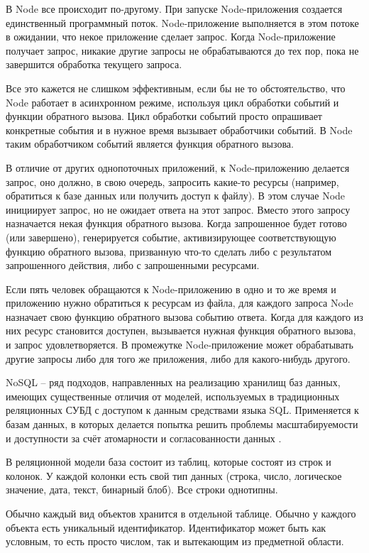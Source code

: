 В Node все происходит по-другому. При запуске Node-приложения создается единственный программный поток. Node-приложение выполняется в этом потоке в ожидании, что некое приложение сделает запрос. Когда Node-приложение получает запрос, никакие другие запросы не обрабатываются до тех пор, пока не завершится обработка текущего запроса.

Все это кажется не слишком эффективным, если бы не то обстоятельство, что Node работает в асинхронном режиме, используя цикл обработки событий и функции обратного вызова. Цикл обработки событий просто опрашивает конкретные события и в нужное время вызывает обработчики событий. В Node таким обработчиком событий является функция обратного вызова.

В отличие от других однопоточных приложений, к Node-приложению делается запрос, оно должно, в свою очередь, запросить какие-то ресурсы (например, обратиться к базе данных или получить доступ к файлу). В этом случае Node инициирует запрос, но не ожидает ответа на этот запрос. Вместо этого запросу назначается некая функция обратного вызова. Когда запрошенное будет готово (или завершено), генерируется событие, активизирующее соответствующую функцию обратного вызова, призванную что-то сделать либо с результатом запрошенного действия, либо с запрошенными ресурсами.

Если пять человек обращаются к Node-приложению в одно и то же время и приложению нужно обратиться к ресурсам из файла, для каждого запроса Node назначает свою функцию обратного вызова событию ответа. Когда для каждого из них ресурс становится доступен, вызывается нужная функция обратного вызова, и запрос удовлетворяется. В промежутке Node-приложение может обрабатывать другие запросы либо для того же приложения, либо для какого-нибудь  другого.

NoSQL -- ряд подходов, направленных на реализацию хранилищ баз данных, имеющих существенные отличия от моделей, используемых в традиционных реляционных СУБД с доступом к данным средствами языка SQL. Применяется к базам данных, в которых делается попытка решить проблемы масштабируемости и доступности за счёт атомарности и согласованности данных \cite{nosql}.

В реляционной модели база состоит из таблиц, которые состоят из строк и колонок. У каждой колонки есть свой тип данных (строка, число, логическое значение, дата, текст, бинарный блоб). Все строки однотипны.

Обычно каждый вид объектов хранится в отдельной таблице. Обычно у каждого объекта есть уникальный идентификатор. Идентификатор может быть как условным, то есть просто числом, так и вытекающим из предметной области.

